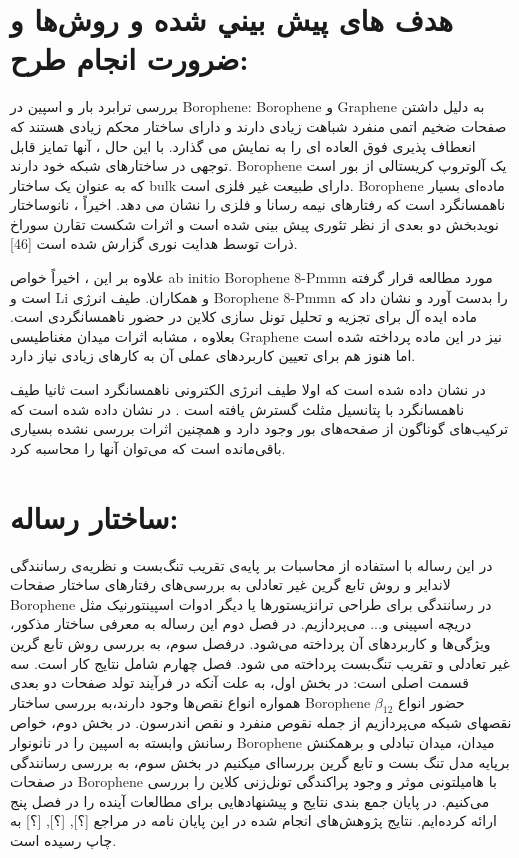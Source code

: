 \section{هدف های پيش بيني شده و روش‌ها و ضرورت انجام طرح:}
بررسی ترابرد بار و اسپین در \gls{Borophene}:
\gls{Borophene} و \gls{Graphene} به دلیل داشتن صفحات ضخیم اتمی منفرد شباهت زیادی دارند و دارای ساختار محکم زیادی هستند که انعطاف پذیری فوق العاده ای را به نمایش می گذارد. با این حال ، آنها تمایز قابل توجهی در ساختارهای شبکه خود دارند. \gls{Borophene} یک آلوتروپ کریستالی از بور است که به عنوان یک ساختار \gls{bulk} دارای طبیعت غیر فلزی است. \gls{Borophene} ماده‌ای بسیار ناهمسانگرد است که رفتارهای نیمه رسانا و فلزی را نشان می دهد. اخیراً ، نانوساختار نویدبخش دو بعدی از نظر تئوری پیش بینی شده است و اثرات شکست تقارن سوراخ ذرات توسط هدایت نوری گزارش شده است [46]. 

علاوه بر این ، اخیراً خواص \gls{ab initio}  \gls{Borophene} 8-Pmmn مورد مطالعه قرار گرفته است \cite{lopez2016electronic} و \gls{Li} و همکاران. \cite{li2017generation} طیف انرژی \gls{Borophene} 8-Pmmn را بدست آورد و نشان داد که ماده ایده آل برای تجزیه و تحلیل تونل سازی کلاین در حضور ناهمسانگردی است. بعلاوه ، مشابه اثرات میدان مغناطیسی \gls{Graphene} نیز در این ماده پرداخته شده است \cite{zabolotskiy2016strain} اما هنوز هم برای تعیین کاربردهای عملی آن به کارهای زیادی نیاز دارد.

در \cite{defne2019triangular} نشان داده شده است که اولا طیف انرژی الکترونی ناهمسانگرد است ثانیا طیف ناهمسانگرد با پتانسیل مثلث گسترش یافته است .
در \cite{defne2019triangular} نشان داده شده‌ است که ترکیب‌های گوناگون از صفحه‌های بور وجود دارد و همچنین اثرات بررسی نشده بسیاری باقی‌مانده است که می‌توان آنها را محاسبه کرد.

\section{ساختار رساله:}
 در این رساله با استفاده از محاسبات بر پایه‌ی تقریب تنگ‌بست و نظریه‌ی  رسانندگی لانداير و روش تابع گرین غیر تعادلی به بررسی‌های
 رفتارهای ساختار صفحات \gls{Borophene} در رسانندگی برای طراحی ترانزیستورها یا دیگر ادوات اسپینتورنیک مثل دریچه اسپینی و... می‌پردازیم. در فصل دوم 
 این رساله به معرفی ساختار مذکور، ویژگی‌ها و کاربردهای آن  پرداخته می‌شود. درفصل سوم، به
 بررسی روش تابع گرین غیر تعادلی و تقریب تنگ‌بست پرداخته می شود.
 فصل چهارم شامل نتایج کار است. سه قسمت اصلی است: در بخش اول، به علت آنکه در فرآیند تولد صفحات دو بعدی همواره انواع نقص‌ها وجود دارند،به بررسی ساختار \gls{Borophene} $\beta_{12}$ حضور
 انواع نقصهای شبکه می‌پردازیم از جمله نقوص منفرد و نقص اندرسون.  در بخش دوم، خواص رسانش وابسته  به اسپین را در نانونوار \gls{Borophene} میدان، میدان تبادلی و برهمكنش بر‌پایه مدل تنگ بست و تابع گرین بررساای میکنیم در بخش سوم، به بررسی رسانندگی در صفحات \gls{Borophene} با هامیلتونی موثر و وجود پراکندگی تونل‌زنی کلاین را بررسی می‌کنیم. در پایان جمع بندی نتایج و پیشنهادهایی برای مطالعات آینده را در فصل پنج ارائه کرده‌ایم.
 نتایج پژوهش‌های انجام شده در این پایان نامه در مراجع [؟], [؟], [؟] به چاپ رسیده است.
 
